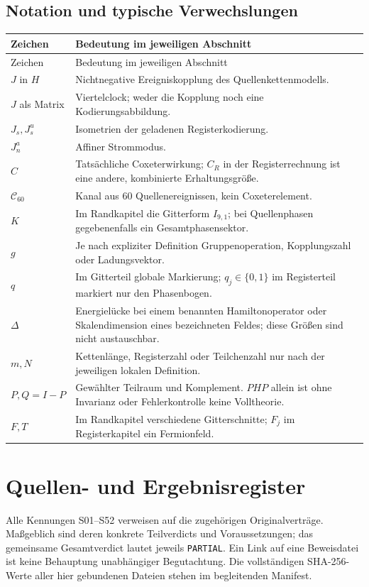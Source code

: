 \section{Notation und typische Verwechslungen}
\begin{longtable}{@{}P{.22\textwidth}P{.7\textwidth}@{}}
\toprule Zeichen & Bedeutung im jeweiligen Abschnitt\\\midrule\endfirsthead
\toprule Zeichen & Bedeutung im jeweiligen Abschnitt\\\midrule\endhead
$J$ in $H$ & Nichtnegative Ereigniskopplung des Quellenkettenmodells.\\
$J$ als Matrix & Viertelclock; weder die Kopplung noch eine Kodierungsabbildung.\\
$J_s,J_s^u$ & Isometrien der geladenen Registerkodierung.\\
$J_n^a$ & Affiner Strommodus.\\
$C$ & Tatsächliche Coxeterwirkung; $C_R$ in der Registerrechnung ist eine andere, kombinierte Erhaltungsgröße.\\
$\mathcal C_{60}$ & Kanal aus 60 Quellenereignissen, kein Coxeterelement.\\
$K$ & Im Randkapitel die Gitterform $I_{9,1}$; bei Quellenphasen gegebenenfalls ein Gesamtphasensektor.\\
$g$ & Je nach expliziter Definition Gruppenoperation, Kopplungszahl oder Ladungsvektor.\\
$q$ & Im Gitterteil globale Markierung; $q_j\in\{0,1\}$ im Registerteil markiert nur den Phasenbogen.\\
$\Delta$ & Energielücke bei einem benannten Hamiltonoperator oder Skalendimension eines bezeichneten Feldes; diese Größen sind nicht austauschbar.\\
$m,N$ & Kettenlänge, Registerzahl oder Teilchenzahl nur nach der jeweiligen lokalen Definition.\\
$P,Q=I-P$ & Gewählter Teilraum und Komplement. $PHP$ allein ist ohne Invarianz oder Fehlerkontrolle keine Volltheorie.\\
$F,T$ & Im Randkapitel verschiedene Gitterschnitte; $F_j$ im Registerkapitel ein Fermionfeld.\\\bottomrule
\end{longtable}


\appendix


\chapter{Quellen- und Ergebnisregister}
Alle Kennungen S01--S52 verweisen auf die zugehörigen Originalverträge. Maßgeblich sind deren konkrete Teilverdicts und Voraussetzungen; das gemeinsame Gesamtverdict lautet jeweils \texttt{PARTIAL}. Ein Link auf eine Beweisdatei ist keine Behauptung unabhängiger Begutachtung. Die vollständigen SHA-256-Werte aller hier gebundenen Dateien stehen im begleitenden Manifest.

